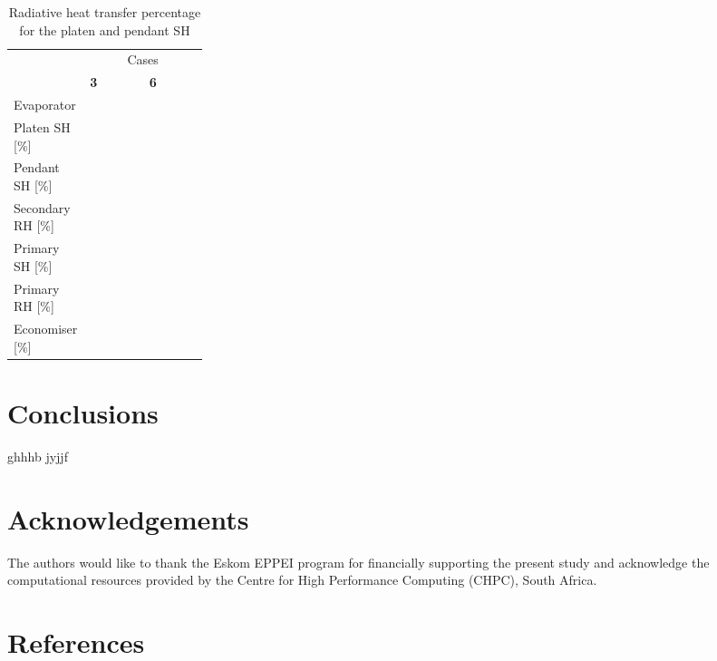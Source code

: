 \documentclass[review]{elsarticle}
\begin{document}
\begin{table}[h!]
\centering
\caption{Radiative heat transfer percentage for the platen and pendant SH}
\label{fuel}
{\tabulinesep=1.2mm
\begin{tabularx}{\linewidth}{p{0.25\linewidth} XX}
\hline
&\multicolumn{2}{c}{Cases}\\
 &\textbf{3}&\textbf{6}\\
\hline
Evaporator \\
Platen SH [\%] & \\
Pendant SH [\%] &\\
Secondary RH [\%]\\
Primary SH [\%]\\
Primary RH [\%]\\
Economiser [\%]\\
\hline
\end{tabularx}}
\end{table}

\clearpage
\section{Conclusions}
ghhhb
jyjjf
\section*{Acknowledgements}
The authors would like to thank the Eskom EPPEI program for financially supporting the present study and acknowledge the computational resources provided by the Centre for High Performance Computing (CHPC), South Africa.

\section*{References}


\end{document}
